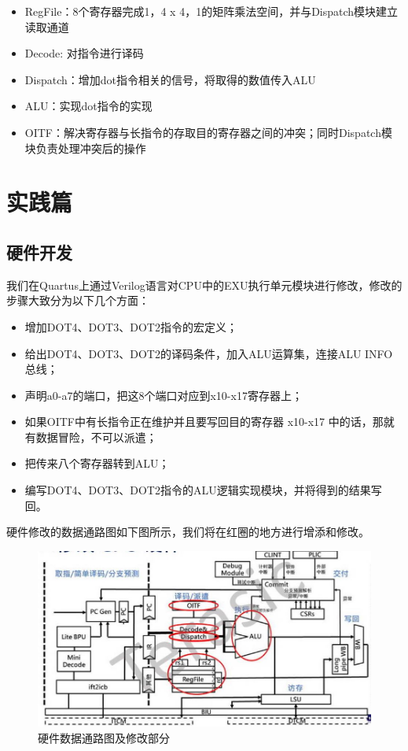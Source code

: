 \documentclass[a4paper, 14pt, oneside]{book} %
\numberwithin{equation}{subsection}
\begin{document}
\begin{enumerate}
\begin{figure}[!htbp]
			\end{figure}
			\begin{itemize}
				\item RegFile：8个寄存器完成1，4 x 4，1的矩阵乘法空间，并与Dispatch模块建立读取通道
				\item Decode: 对指令进行译码
				\item Dispatch：增加dot指令相关的信号，将取得的数值传入ALU
				\item ALU：实现dot指令的实现
				\item OITF：解决寄存器与长指令的存取目的寄存器之间的冲突；同时Dispatch模块负责处理冲突后的操作
			\end{itemize}
		\end{enumerate}
		
		
	\section{实践篇}
	\subsection{硬件开发}
	我们在Quartus上通过Verilog语言对CPU中的EXU执行单元模块进行修改，修改的步骤大致分为以下几个方面：
	\begin{itemize}
		\item 增加DOT4、DOT3、DOT2指令的宏定义；
		\item 给出DOT4、DOT3、DOT2的译码条件，加入ALU运算集，连接ALU INFO总线；
		\item 声明a0-a7的端口，把这8个端口对应到x10-x17寄存器上；
		\item 如果OITF中有长指令正在维护并且要写回目的寄存器 x10-x17 中的话，那就有数据冒险，不可以派遣；
		\item 把传来八个寄存器转到ALU；
		\item 编写DOT4、DOT3、DOT2指令的ALU逻辑实现模块，并将得到的结果写回。
	\end{itemize}
	硬件修改的数据通路图如下图所示，我们将在红圈的地方进行增添和修改。
	\begin{figure}[H]
		\centering
		\includegraphics[scale=0.8]{img/datalink.jpg}
		\caption{硬件数据通路图及修改部分}
	\end{figure}
\end{document}
